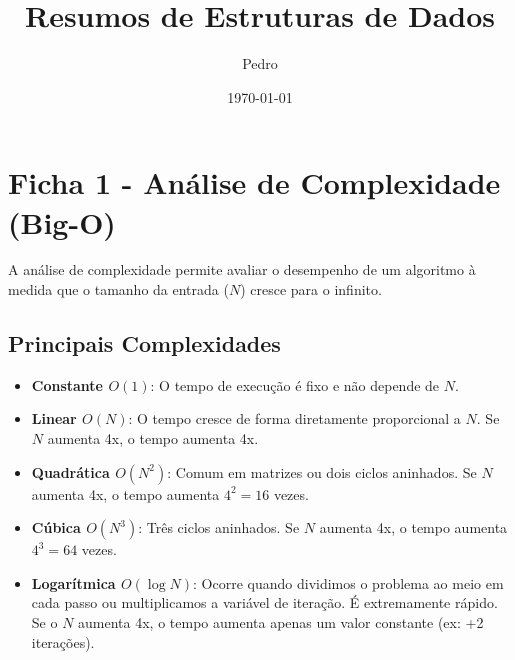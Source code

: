 \documentclass[12pt,a4paper]{article}
\title{Resumos de Estruturas de Dados}
\author{Pedro}
\date{\today}
\begin{document}
\maketitle

\section{Ficha 1 - Análise de Complexidade (Big-O)}
A análise de complexidade permite avaliar o desempenho de um algoritmo à medida que o tamanho da entrada ($N$) cresce para o infinito.

\subsection*{Principais Complexidades}
\begin{itemize}
    \item \textbf{Constante $O(1)$}: O tempo de execução é fixo e não depende de $N$.
    \item \textbf{Linear $O(N)$}: O tempo cresce de forma diretamente proporcional a $N$. Se $N$ aumenta 4x, o tempo aumenta 4x.
    \item \textbf{Quadrática $O(N^2)$}: Comum em matrizes ou dois ciclos aninhados. Se $N$ aumenta 4x, o tempo aumenta $4^2 = 16$ vezes.
    \item \textbf{Cúbica $O(N^3)$}: Três ciclos aninhados. Se $N$ aumenta 4x, o tempo aumenta $4^3 = 64$ vezes.
    \item \textbf{Logarítmica $O(\log N)$}: Ocorre quando dividimos o problema ao meio em cada passo ou multiplicamos a variável de iteração. É extremamente rápido. Se o $N$ aumenta 4x, o tempo aumenta apenas um valor constante (ex: +2 iterações).
\end{itemize}
\end{document}
